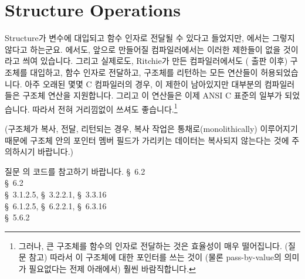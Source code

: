\section{Structure Operations}
\begin{faq}
	Structure가 변수에 대입되고 함수 인자로 전달될 수 있다고 들었지만,
	\cite{kr1}에서는 그렇지 않다고 하는군요.
\A
        \cite{kr1}에서도, 앞으로 만들어질 컴파일러에서는 이러한 제한들이
        없을 것이라고 씌여 있습니다. 그리고 실제로도, Ritchie가 만든 
        컴파일러에서도 (\cite{kr1} 출판 이후) 구조체를 대입하고, 함수
        인자로 전달하고, 구조체를 리턴하는 모든 연산들이 허용되었습니다.
        아주 오래된 몇몇 C 컴파일러의 경우,
        이 제한이 남아있지만 대부분의 컴파일러들은 구조체 연산을 지원합니다.
        그리고 이 연산들은 이제 ANSI C 표준의 일부가 되었습니다. 따라서 전혀
        거리낌없이 쓰셔도 좋습니다.\footnote{그러나, 큰 구조체를 함수의 인자로
          전달하는 것은 효율성이 매우 떨어집니다. (질문  참고)
          따라서 이 구조체에 대한 포인터를 쓰는 것이 (물론 pass-by-value의
          의미가 필요없다는 전제 아래에서) 훨씬 바람직합니다.}

	(구조체가 복사, 전달, 리턴되는 경우, 복사 작업은 통채로(monolithically)
	이루어지기 때문에 구조체 안의 포인터 멤버 필드가 가리키는 데이터는
        복사되지 않는다는 것에 주의하시기 바랍니다.)

        질문 의 코드를 참고하기 바랍니다.
\R
	\cite{kr1} \S\ 6.2  \\
	\cite{kr2} \S\ 6.2  \\
        \cite{ansi} \S\ 3.1.2.5, \S\ 3.2.2.1, \S\ 3.3.16 \\
	\cite{c89} \S\ 6.1.2.5, \S\ 6.2.2.1, \S\ 6.3.16 \\
	\cite{hs} \S\ 5.6.2 
\end{faq}

